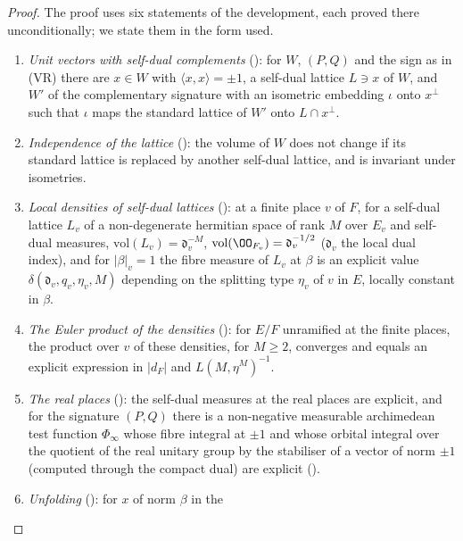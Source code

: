 \begin{proof}
The proof uses six statements of the development, each proved there unconditionally; we state them in the form used.
\begin{enumerate}[label=(V\arabic*)]
\item\label{pf:sh-div:V:perp} \emph{Unit vectors with self-dual complements}
(): for $W$, $(P,Q)$ and the sign as in (VR) there are $x\in W$ with
$\langle x,x\rangle=\pm1$, a self-dual lattice $L\ni x$ of $W$, and $W'$ of the complementary signature with an isometric
embedding $\iota$ onto $x^\perp$ such that $\iota$ maps the standard lattice of $W'$ onto $L\cap x^\perp$.
\item\label{pf:sh-div:V:indep} \emph{Independence of the lattice} (): the volume
of $W$ does not change if its standard lattice is replaced by another self-dual lattice, and is invariant under isometries.
\item\label{pf:sh-div:V:dens} \emph{Local densities of self-dual lattices}
(): at a finite place $v$ of $F$, for a self-dual lattice $L_v$
of a non-degenerate hermitian space of rank $M$ over $E_v$ and self-dual measures, $\mathrm{vol}(L_v)=\mathfrak d_v^{-M}$,
$\mathrm{vol}(\OO_{F_v})=\mathfrak d_v^{-1/2}$ ($\mathfrak d_v$ the local dual index), and for $|\beta|_v=1$ the fibre measure of
$L_v$ at $\beta$ is an explicit value $\delta(\mathfrak d_v,q_v,\eta_v,M)$ depending on the splitting type $\eta_v$ of $v$ in $E$, locally
constant in $\beta$.
\item\label{pf:sh-div:V:euler} \emph{The Euler product of the densities}
(): for $E/F$ unramified at the finite places, the product over
$v$ of these densities, for $M\ge2$, converges and equals an explicit expression in $|d_F|$ and $L(M,\eta^M)^{-1}$.
\item\label{pf:sh-div:V:real} \emph{The real places} (): the
self-dual measures at the real places are explicit, and for the signature $(P,Q)$ there is a non-negative measurable archimedean test
function $\Phi_\infty$ whose fibre integral at $\pm1$ and whose orbital integral over the quotient of the real unitary group by the
stabiliser of a vector of norm $\pm1$ (computed through the compact dual) are explicit
().
\item\label{pf:sh-div:V:unf} \emph{Unfolding} (): for $x$ of norm $\beta$ in the

\end{enumerate}
\end{proof}
